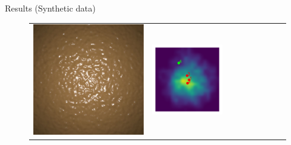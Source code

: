 \documentclass[final]{beamer}
\newlength{\twocolwid}
\newlength{\resultwidth}
\begin{document}
\begin{frame}[t]
\begin{columns}[t]
\begin{column}{\twocolwid}
\begin{block}{Results (Synthetic data)}
\begin{figure}[t]
\begin{tabular}{ccrclcccc}
            		\includegraphics[width=\resultwidth]{images/synth/bump/optim.jpg} &
            		\includegraphics[width=\resultwidth]{images/synth/bump/posterior.pdf} &

\end{tabular}
\end{figure}
\end{block}
\end{column}
\end{columns}
\end{frame}
\end{document}
